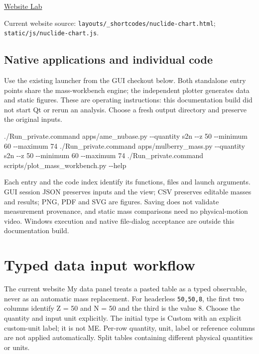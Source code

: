 \documentclass[
  11pt,
  letterpaper,
]{article}
\newenvironment{Shaded}{}{}
\newcommand{\AttributeTok}[1]{\textcolor[rgb]{0.49,0.56,0.16}{#1}}
\newcommand{\ExtensionTok}[1]{#1}
\newcommand{\NormalTok}[1]{#1}
\begin{document}
\href{https://gezhuang0717.github.io/traps.github.io/lab/}{Website Lab}

Current website source:
\texttt{layouts/\_shortcodes/nuclide-chart.html};
\texttt{static/js/nuclide-chart.js}.

\subsection{Native applications and individual
code}\label{native-applications-and-individual-code}

Use the existing launcher from the GUI checkout below. Both standalone
entry points share the mass-workbench engine; the independent plotter
generates data and static figures. These are operating instructions:
this documentation build did not start Qt or rerun an analysis. Choose a
fresh output directory and preserve the original inputs.

\begin{Shaded}
\begin{Highlighting}[]

\ExtensionTok{./Run\_private.command}\NormalTok{ apps/ame\_nubase.py }\AttributeTok{{-}{-}quantity}\NormalTok{ s2n }\AttributeTok{{-}{-}z}\NormalTok{ 50 }\AttributeTok{{-}{-}minimum}\NormalTok{ 60 }\AttributeTok{{-}{-}maximum}\NormalTok{ 74}
\ExtensionTok{./Run\_private.command}\NormalTok{ apps/mulberry\_mass.py }\AttributeTok{{-}{-}quantity}\NormalTok{ s2n }\AttributeTok{{-}{-}z}\NormalTok{ 50 }\AttributeTok{{-}{-}minimum}\NormalTok{ 60 }\AttributeTok{{-}{-}maximum}\NormalTok{ 74}
\ExtensionTok{./Run\_private.command}\NormalTok{ scripts/plot\_mass\_workbench.py }\AttributeTok{{-}{-}help}
\end{Highlighting}
\end{Shaded}

Each entry and the code index identify its functions, files and launch
arguments. GUI session JSON preserves inputs and the view; CSV preserves
editable masses and results; PNG, PDF and SVG are figures. Saving does
not validate measurement provenance, and static mass comparisons need no
physical-motion video. Windows execution and native file-dialog
acceptance are outside this documentation build.

\section{Typed data input workflow}\label{typed-data-input-workflow}

The current website My data panel treats a pasted table as a typed
observable, never as an automatic mass replacement. For headerless
\texttt{50,50,8}, the first two columns identify Z = 50 and N = 50 and
the third is the value 8. Choose the quantity and input unit explicitly.
The initial type is Custom with an explicit custom-unit label; it is not
ME. Per-row quantity, unit, label or reference columns are not applied
automatically. Split tables containing different physical quantities or
units.
\end{document}
